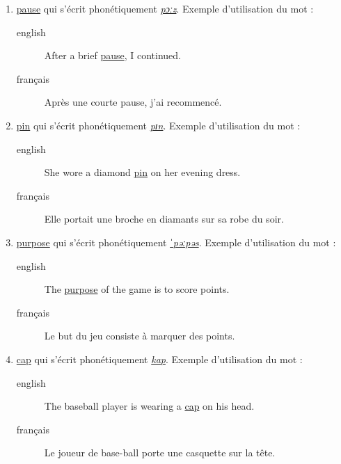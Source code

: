 \begin{enumerate}
\item \href{http://www.wordreference.com/enfr/pause}{pause} qui s'écrit phonétiquement \href{https://en.oxforddictionaries.com/definition/pause}{\emph{pɔːz}}. Exemple d'utilisation du mot :
\begin{description}
\item[{english}] \textenglish{After a brief \href{https://youtu.be/v\_UlZ0Y9Vho}{pause}, I continued.}
\item[{français}] Après une courte pause, j'ai recommencé.
\end{description}
\item \href{http://www.wordreference.com/enfr/pin}{pin} qui s'écrit phonétiquement \href{https://en.oxforddictionaries.com/definition/pin}{\emph{pɪn}}. Exemple d'utilisation du mot :
\begin{description}
\item[{english}] \textenglish{She wore a diamond \href{https://youtu.be/DMoeYWQmRuQ}{pin} on her evening dress.}
\item[{français}] Elle portait une broche en diamants sur sa robe du
soir.
\end{description}
\item \href{http://www.wordreference.com/enfr/purpose}{purpose} qui s'écrit phonétiquement \href{https://en.oxforddictionaries.com/definition/purpose}{\emph{ˈpəːpəs}}. Exemple d'utilisation du mot :
\begin{description}
\item[{english}] \textenglish{The \href{https://youtu.be/J8yhsbMULsQ}{purpose} of the game is to score points.}
\item[{français}] Le but du jeu consiste à marquer des points.
\end{description}
\item \href{http://www.wordreference.com/enfr/cap}{cap} qui s'écrit phonétiquement \href{https://en.oxforddictionaries.com/definition/cap}{\emph{kap}}. Exemple d'utilisation du mot :
\begin{description}
\item[{english}] \textenglish{The baseball player is wearing a \href{https://youtu.be/Dkzh8b5Mj3s}{cap} on his head.}
\item[{français}] Le joueur de base-ball porte une casquette sur la
tête.
\end{description}
\end{enumerate}

